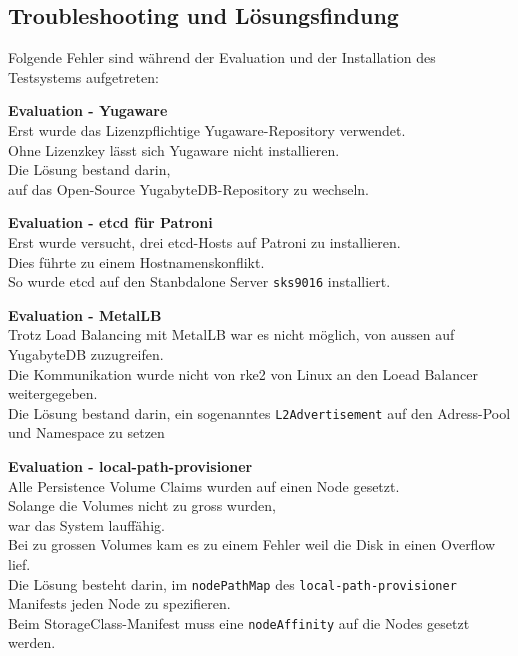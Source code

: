 
\begin{flushleft}
    \section{Troubleshooting und Lösungsfindung}
    Folgende Fehler sind während der Evaluation und der Installation des Testsystems aufgetreten:\\
    \begin{description}
        \item \textbf{Evaluation - Yugaware}\hfill \\Erst wurde das Lizenzpflichtige Yugaware-Repository verwendet.\\Ohne Lizenzkey lässt sich Yugaware nicht installieren.\\Die Lösung bestand darin,\\auf das Open-Source YugabyteDB-Repository zu wechseln.
        \item \textbf{Evaluation - etcd für Patroni}\hfill \\Erst wurde versucht, drei etcd-Hosts auf Patroni zu installieren.\\Dies führte zu einem Hostnamenskonflikt.\\So wurde etcd auf den Stanbdalone Server \texttt{sks9016} installiert.
        \item \textbf{Evaluation - MetalLB}\hfill \\Trotz Load Balancing mit \Gls{MetalLB} war es nicht möglich, von aussen auf YugabyteDB zuzugreifen.\\Die Kommunikation wurde nicht von \gls{rke2} von Linux an den Loead Balancer weitergegeben.\\Die Lösung bestand darin, ein sogenanntes \texttt{L2Advertisement} auf den Adress-Pool und Namespace zu setzen
        \item \textbf{Evaluation - local-path-provisioner}\hfill \\Alle Persistence Volume Claims wurden auf einen Node gesetzt.\\Solange die Volumes nicht zu gross wurden,\\war das System lauffähig.\\Bei zu grossen Volumes kam es zu einem Fehler weil die Disk in einen Overflow lief.\\Die Lösung besteht darin, im \texttt{nodePathMap} des \texttt{\gls{local-path-provisioner}} Manifests jeden Node zu spezifieren.\\Beim StorageClass-Manifest muss eine \texttt{nodeAffinity} auf die Nodes gesetzt werden.

\end{description}
\end{flushleft}
